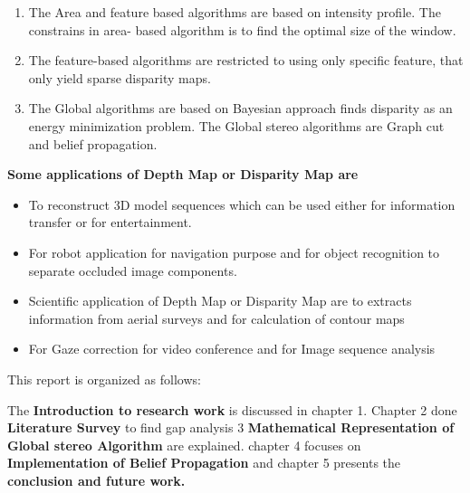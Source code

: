  \begin{enumerate}
   \item The Area and feature based algorithms are based on intensity profile. The constrains in area- based algorithm is to find the optimal size of the window.
   \item The feature-based algorithms are restricted to using only specific feature, that only yield sparse disparity maps.
   \item The Global algorithms are based on Bayesian approach finds disparity   as an energy minimization problem. The Global stereo algorithms are Graph cut and belief propagation.
 \end{enumerate}
 
\textbf{Some applications of Depth Map or Disparity Map are}
\begin{itemize}
  \item To reconstruct 3D model sequences which can be used either for information transfer or for entertainment.
  \item For robot application for   navigation purpose and for object recognition to separate occluded image components.
  \item Scientific application of Depth Map or Disparity Map  are to extracts information from aerial surveys and for calculation of contour maps
\item For Gaze correction for video conference and for Image sequence analysis
\end{itemize}





This report is organized as follows:

The \textbf{Introduction to research work} is discussed in chapter 1. Chapter 2 done \textbf{Literature Survey} to find gap analysis 3 \textbf{Mathematical Representation of Global stereo Algorithm} are explained. chapter 4 focuses on \textbf{Implementation of Belief Propagation}  and chapter 5 presents the \textbf{conclusion and future work.}

